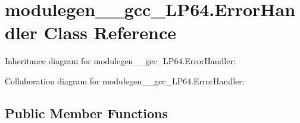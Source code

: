 \hypertarget{classmodulegen____gcc__LP64_1_1ErrorHandler}{}\section{modulegen\+\_\+\+\_\+gcc\+\_\+\+L\+P64.\+Error\+Handler Class Reference}
\label{classmodulegen____gcc__LP64_1_1ErrorHandler}


Inheritance diagram for modulegen\+\_\+\+\_\+gcc\+\_\+\+L\+P64.\+Error\+Handler\+:


Collaboration diagram for modulegen\+\_\+\+\_\+gcc\+\_\+\+L\+P64.\+Error\+Handler\+:
\subsection*{Public Member Functions}
